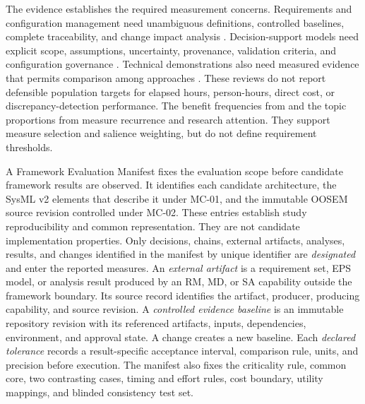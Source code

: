 \documentclass[11pt,a4paper]{article}
\begin{document}
The evidence establishes the required measurement concerns. Requirements and configuration management need unambiguous definitions, controlled baselines, complete traceability, and change impact analysis \citep[Sec.~4.4]{buruso2026modelbased}. Decision-support models need explicit scope, assumptions, uncertainty, provenance, validation criteria, and configuration governance \citep[Secs.~8.4--8.6 and Table~13]{rostamnia2026digitaltwin}. Technical demonstrations also need measured evidence that permits comparison among approaches \citep[Sec.~6.2]{rojasramirez2022comparative}. These reviews do not report defensible population targets for elapsed hours, person-hours, direct cost, or discrepancy-detection performance. The benefit frequencies from \citet[Sec.~4.7 and Table~3]{vizitiu2025optimizing} and the topic proportions from \citet[Table~4]{akundi2022textmining} measure recurrence and research attention. They support measure selection and salience weighting, but do not define requirement thresholds.

A Framework Evaluation Manifest fixes the evaluation scope before candidate framework results are observed. It identifies each candidate architecture, the SysML v2 elements that describe it under MC-01, and the immutable OOSEM source revision controlled under MC-02. These entries establish study reproducibility and common representation. They are not candidate implementation properties. Only decisions, chains, external artifacts, analyses, results, and changes identified in the manifest by unique identifier are \emph{designated} and enter the reported measures. An \emph{external artifact} is a requirement set, EPS model, or analysis result produced by an RM, MD, or SA capability outside the framework boundary. Its source record identifies the artifact, producer, producing capability, and source revision. A \emph{controlled evidence baseline} is an immutable repository revision with its referenced artifacts, inputs, dependencies, environment, and approval state. A change creates a new baseline. Each \emph{declared tolerance} records a result-specific acceptance interval, comparison rule, units, and precision before execution. The manifest also fixes the criticality rule, common core, two contrasting cases, timing and effort rules, cost boundary, utility mappings, and blinded consistency test set.
\end{document}
